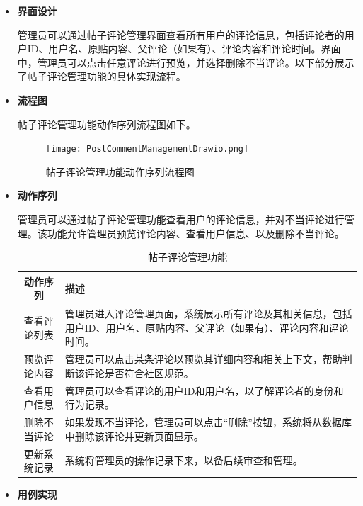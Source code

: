 \begin{itemize}
	\item \textbf{界面设计}
	
	管理员可以通过帖子评论管理界面查看所有用户的评论信息，包括评论者的用户ID、用户名、原贴内容、父评论（如果有）、评论内容和评论时间。界面中，管理员可以点击任意评论进行预览，并选择删除不当评论。以下部分展示了帖子评论管理功能的具体实现流程。
	
	\item \textbf{流程图}
	
	帖子评论管理功能动作序列流程图如下。
	
	\begin{figure}[H]
		\centering
		\texttt{[image: PostCommentManagementDrawio.png]} 
		\caption{帖子评论管理功能动作序列流程图}
		\label{fig:post-comment-management.drawio}
	\end{figure}
	
	\item \textbf{动作序列}
	
	管理员可以通过帖子评论管理功能查看用户的评论信息，并对不当评论进行管理。该功能允许管理员预览评论内容、查看用户信息、以及删除不当评论。
	
	\begin{table}[H]
		\centering
		\caption{帖子评论管理功能}
		\renewcommand\arraystretch{1.5}
		\begin{tabular}{|c|>{\raggedright\arraybackslash}p{8cm}|}
			\hline
			\textbf{动作序列} & \textbf{描述} \\ \hline
			查看评论列表 & 管理员进入评论管理页面，系统展示所有评论及其相关信息，包括用户ID、用户名、原贴内容、父评论（如果有）、评论内容和评论时间。 \\ \hline
			预览评论内容 & 管理员可以点击某条评论以预览其详细内容和相关上下文，帮助判断该评论是否符合社区规范。 \\ \hline
			查看用户信息 & 管理员可以查看评论的用户ID和用户名，以了解评论者的身份和行为记录。 \\ \hline
			删除不当评论 & 如果发现不当评论，管理员可以点击“删除”按钮，系统将从数据库中删除该评论并更新页面显示。 \\ \hline
			更新系统记录 & 系统将管理员的操作记录下来，以备后续审查和管理。 \\ \hline
		\end{tabular}
		
	\end{table}
	
	\item \textbf{用例实现}
	

\end{itemize}
